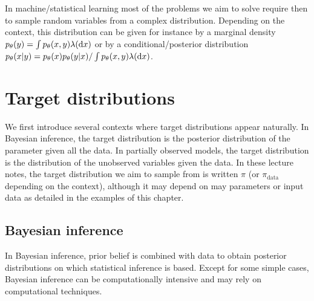 \documentclass[english,graybox,envcountchap,envcountsame,sectrefs,shortlabels]{svmono}
\theoremstyle{style}
\begin{document}
In machine/statistical learning most of the problems we aim to solve require then to sample random variables from a complex distribution. Depending on the context, this distribution can be given for instance by a marginal density $p_\theta(y) = \int p_\theta(x,y) \lambda(\mathrm{d} x)$ or by a conditional/posterior distribution $p_\theta(x|y) = p_\theta(x)p_\theta(y|x)/\int p_\theta(x,y) \lambda(\mathrm{d} x)$.



\section{Target distributions}
We first introduce several contexts where target distributions appear naturally. In Bayesian inference, the target distribution is the posterior distribution of the parameter given all the data. In partially observed models, the target distribution is the distribution of the unobserved variables given the data. In these lecture notes, the target distribution we aim to sample from is written $\pi$ (or $\pi_{\mathrm{data}}$ depending on the context), although it may depend on may parameters or input data as detailed in the examples of this chapter.

\subsection{Bayesian inference}
In  Bayesian inference, prior belief  is combined with
data to obtain posterior distributions on which statistical inference is based.
Except for some simple cases, Bayesian inference can be computationally
intensive and may rely on  computational techniques.
\end{document}
